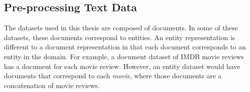 



\subsection{Pre-processing Text Data}\label{ch2:data}



The datasets used in this thesis are composed of documents. In some of these datasets, these documents correspond to entities. An entity representation is different to a document representation in that each document corresponds to an entity in the domain. For example, a document dataset of IMDB movie reviews has a document for each movie review. However, an entity dataset would have documents that correspond to each \textit{movie}, where those documents are a concatenation of movie reviews.








